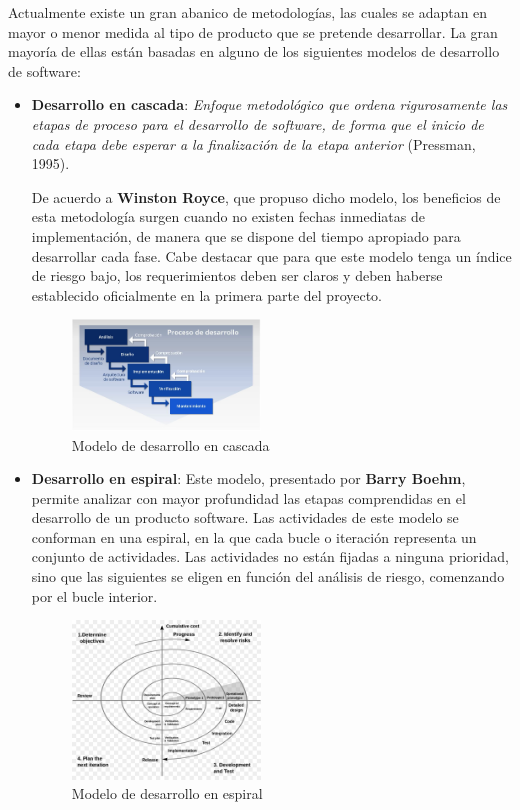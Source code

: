 Actualmente existe un gran abanico de metodologías, las cuales se adaptan en mayor o menor medida al tipo de producto 
que se pretende desarrollar. La gran mayoría de ellas están basadas en alguno de los siguientes modelos de desarrollo 
de software:
\begin{itemize}
    \item \textbf{Desarrollo en cascada}: \textit{Enfoque metodológico que ordena rigurosamente las etapas de proceso para el 
    desarrollo de software, de forma que el inicio de cada etapa debe esperar a la finalización de la etapa 
    anterior} (Pressman, 1995). 
    
    De acuerdo a \textbf{Winston Royce}, que propuso dicho modelo, los beneficios de esta metodología surgen cuando no existen 
    fechas inmediatas de implementación, de manera que se dispone del tiempo apropiado para desarrollar cada fase.
    Cabe destacar que para que este modelo tenga un índice de riesgo bajo, los requerimientos deben ser claros y deben 
    haberse establecido oficialmente en la primera parte del proyecto.

    \begin{figure}[H]
        \centering
        \includegraphics[width=5cm]{Figures/modelo_cascada.jpg}
        \caption{Modelo de desarrollo en cascada}
    \end{figure}

    \item \textbf{Desarrollo en espiral}: Este modelo, presentado por \textbf{Barry Boehm}, permite analizar con mayor profundidad 
    las etapas comprendidas en el desarrollo de un producto software. Las actividades de este modelo se conforman en una espiral, 
    en la que cada bucle o iteración representa un conjunto de actividades. Las actividades no están fijadas a ninguna prioridad, 
    sino que las siguientes se eligen en función del análisis de riesgo, comenzando por el bucle interior.

    \begin{figure}[H]
        \centering
        \includegraphics[width=5cm]{Figures/modelo_espiral.jpg}
        \caption{Modelo de desarrollo en espiral}
    \end{figure}


\end{itemize}
